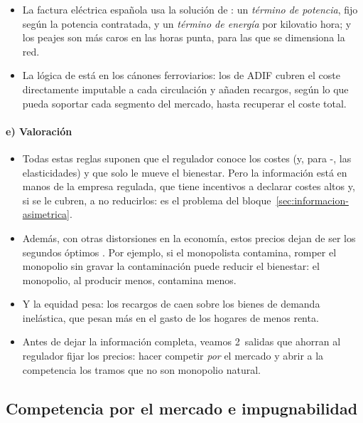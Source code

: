 \documentclass[11pt]{article}
\begin{document}
\begin{itemize}
\item La factura eléctrica española usa la solución de : un \emph{término de potencia}, fijo según la potencia contratada, y un \emph{término de energía} por kilovatio hora; y los peajes son más caros en las horas punta, para las que se dimensiona la red\nocite{CNMC2020Circular3}.
\item La lógica de  está en los cánones ferroviarios: los de ADIF cubren el coste directamente imputable a cada circulación y añaden recargos, según lo que pueda soportar cada segmento del mercado, hasta recuperar el coste total\nocite{BOE2015LSF,UE2012Directiva34}.
\end{itemize}

\paragraph{e) Valoración}

\begin{itemize}
\item Todas estas reglas suponen que el regulador conoce los costes (y, para -, las elasticidades) y que solo le mueve el bienestar. Pero la información está en manos de la empresa regulada, que tiene incentivos a declarar costes altos y, si se le cubren, a no reducirlos: es el problema del bloque~\ref{sec:informacion-asimetrica}.
\item Además, con otras distorsiones en la economía, estos precios dejan de ser los segundos óptimos\nocite{LipseyLancaster1956General} . Por ejemplo, si el monopolista contamina, romper el monopolio sin gravar la contaminación puede reducir el bienestar: el monopolio, al producir menos, contamina menos\nocite{Buchanan1969External}.
\item Y la equidad pesa: los recargos de  caen sobre los bienes de demanda inelástica, que pesan más en el gasto de los hogares de menos renta.
\item Antes de dejar la información completa, veamos 2~salidas que ahorran al regulador fijar los precios: hacer competir \emph{por} el mercado y abrir a la competencia los tramos que no son monopolio natural.
\end{itemize}
\subsection{Competencia por el mercado e impugnabilidad}\label{sec:competencia-por-mercado}
\end{document}

